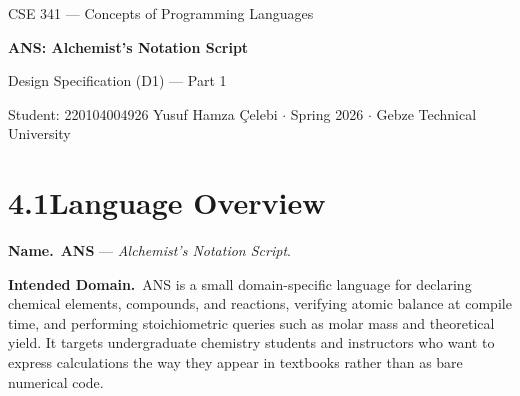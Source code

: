 \documentclass[11pt,a4paper]{article}
\begin{document}
\begin{center}
  {\footnotesize\color{anscaption}
    CSE 341 --- Concepts of Programming Languages\par}
  \vspace{4pt}
  {\Huge\bfseries\sffamily
    ANS: Alchemist's Notation Script\par}
  \vspace{6pt}
  {\Large Design Specification (D1) --- Part 1\par}
  \vspace{8pt}
  {\footnotesize\color{anscaption}
    Student: 220104004926 Yusuf Hamza Çelebi \quad$\cdot$\quad
    Spring 2026 \quad$\cdot$\quad
    Gebze Technical University\par}
\end{center}
\vspace{12pt}

\section{4.1\quad Language Overview}

\textbf{Name.}\, \textbf{ANS} --- \textit{Alchemist's Notation Script}.

\textbf{Intended Domain.}\, ANS is a small domain-specific language for declaring chemical elements, compounds, and reactions, verifying atomic balance at compile time, and performing stoichiometric queries such as molar mass and theoretical yield. It targets undergraduate chemistry students and instructors who want to express calculations the way they appear in textbooks rather than as bare numerical code.
\end{document}
